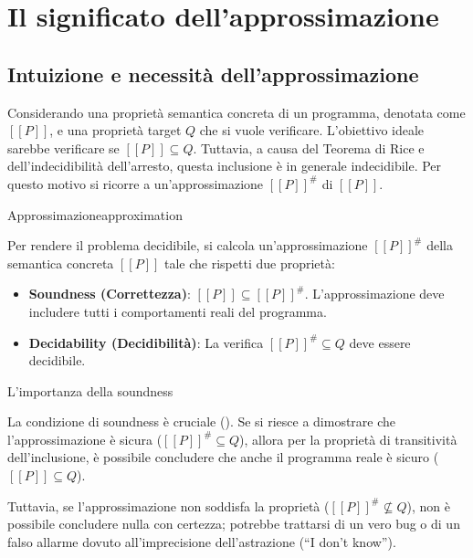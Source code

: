 \section{Il significato dell'approssimazione}

\subsection{Intuizione e necessità dell'approssimazione}

Considerando una proprietà semantica concreta di un programma, denotata come
$[\![P]\!]$, e una proprietà target $Q$ che si vuole verificare.
L'obiettivo ideale sarebbe verificare se $[\![P]\!] \subseteq Q$.
Tuttavia, a causa del Teorema di Rice e dell'indecidibilità dell'arresto,
questa inclusione è in generale indecidibile.
Per questo motivo si ricorre a un'approssimazione ${[\![P]\!]}^{\#}$ di $[\![P]\!]$.

\begin{definizione}{Approssimazione}{approximation}

    Per rendere il problema decidibile, si calcola un'approssimazione
${[\![P]\!]}^{\#}$ della semantica concreta $[\![P]\!]$ tale che rispetti due proprietà:
\begin{itemize}
    \item \textbf{Soundness (Correttezza)}: $[\![P]\!] \subseteq {[\![P]\!]}^{\#}$.
    L'approssimazione deve includere tutti i comportamenti reali del
    programma.
    \item \textbf{Decidability (Decidibilità)}: La verifica
    ${[\![P]\!]}^{\#} \subseteq Q$ deve essere decidibile.
\end{itemize}

\end{definizione}

\begin{nota}{L'importanza della soundness}{}

La condizione di soundness è cruciale ().
Se si riesce a dimostrare che l'approssimazione è sicura
(${[\![P]\!]}^{\#} \subseteq Q$), allora per la proprietà di transitività
dell'inclusione, è possibile concludere che anche il programma reale è
sicuro ($[\![P]\!] \subseteq Q$).

Tuttavia, se l'approssimazione non soddisfa la proprietà
(${[\![P]\!]}^{\#} \not\subseteq Q$), non è possibile concludere nulla con
certezza; potrebbe trattarsi di un vero bug o di un falso allarme dovuto
all'imprecisione dell'astrazione (``I don't know'').

\end{nota}

